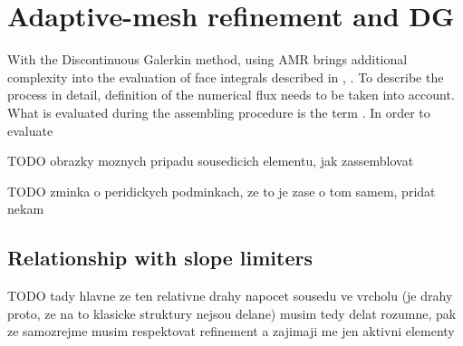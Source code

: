 \section{Adaptive-mesh refinement and DG}
With the Discontinuous Galerkin method, using AMR brings additional complexity into the evaluation of face integrals described in , .
To describe the process in detail, definition of the numerical flux  needs to be taken into account. What is evaluated during the assembling procedure  is the term . In order to evaluate 

TODO obrazky moznych pripadu sousedicich elementu, jak zassemblovat

TODO zminka o peridickych podminkach, ze to je zase o tom samem, pridat nekam \label{amrPer}

\subsection{Relationship with slope limiters}

TODO tady hlavne ze ten relativne drahy napocet sousedu ve vrcholu (je drahy proto, ze na to klasicke struktury nejsou delane) musim tedy delat rozumne, pak ze samozrejme musim respektovat refinement a zajimaji me jen aktivni elementy